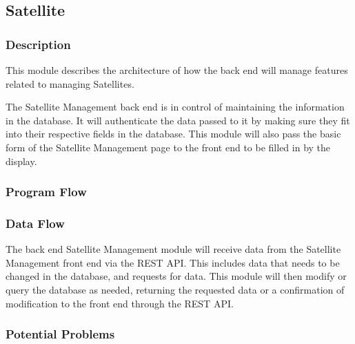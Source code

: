 
\subsection{Satellite}

\subsubsection{Description}

This module describes the architecture of how the back end will manage features related to managing Satellites.

The Satellite Management back end is in control of maintaining the information in the database.  
It will authenticate the data passed to it by making sure they fit into their respective fields in the database. 
This module will also pass the basic form of the Satellite Management page to the front end to be filled in by the display.

\subsubsection{Program Flow}


\subsubsection{Data Flow}
The back end Satellite Management module will receive data from the Satellite Management front end via the REST API. 
This includes data that needs to be changed in the database, and requests for data. 
This module will then modify or query the database as needed, 
returning the requested data or a confirmation of modification to the front end through the REST API. 




\subsubsection{Potential Problems}




